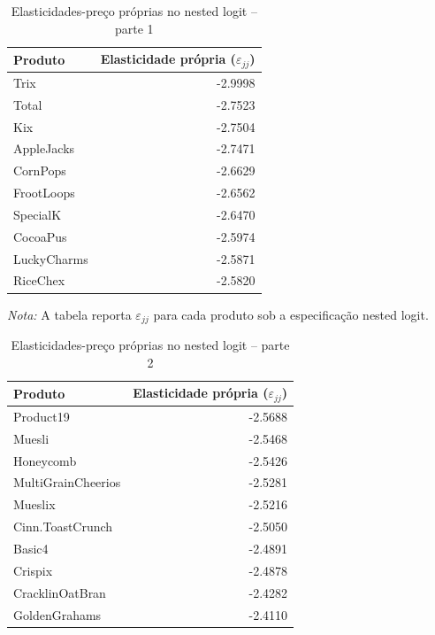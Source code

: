 

\begingroup
\small

\begin{table}[H]
\centering
\caption{Elasticidades-preço próprias no nested logit -- parte 1}
\label{tab:own-elasticities-nested-logit}
\begin{tabular}{lr}
\toprule
Produto & Elasticidade própria ($\varepsilon_{jj}$) \\
\midrule
Trix & -2.9998 \\
Total & -2.7523 \\
Kix & -2.7504 \\
AppleJacks & -2.7471 \\
CornPops & -2.6629 \\
FrootLoops & -2.6562 \\
SpecialK & -2.6470 \\
CocoaPus & -2.5974 \\
LuckyCharms & -2.5871 \\
RiceChex & -2.5820 \\
\bottomrule
\end{tabular}

\vspace{0.3em}
\footnotesize
\textit{Nota:} A tabela reporta $\varepsilon_{jj}$ para cada produto sob a especificação nested logit.
\end{table}

\begin{table}[H]
\centering
\caption{Elasticidades-preço próprias no nested logit -- parte 2}
\label{tab:own-elasticities-nested-logit-parte-2}
\begin{tabular}{lr}
\toprule
Produto & Elasticidade própria ($\varepsilon_{jj}$) \\
\midrule
Product19 & -2.5688 \\
Muesli & -2.5468 \\
Honeycomb & -2.5426 \\
MultiGrainCheerios & -2.5281 \\
Mueslix & -2.5216 \\
Cinn.ToastCrunch & -2.5050 \\
Basic4 & -2.4891 \\
Crispix & -2.4878 \\
CracklinOatBran & -2.4282 \\
GoldenGrahams & -2.4110 \\
\bottomrule
\end{tabular}
\end{table}

